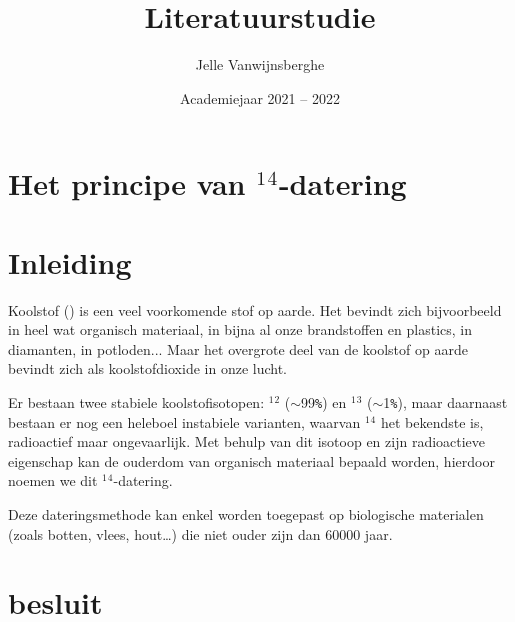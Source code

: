 \documentclass[kulak]{kulakarticle} %
\title{Literatuurstudie}
\author{Jelle Vanwijnsberghe}
\date{Academiejaar 2021 -- 2022}
\begin{document}
\maketitle

\section*{Het principe van $^1$$^4$-datering}

\section*{Inleiding}

Koolstof () is een veel voorkomende stof op aarde. Het bevindt zich bijvoorbeeld in heel wat organisch materiaal, in bijna al onze brandstoffen en plastics, in diamanten, in potloden... Maar het overgrote deel van de koolstof op aarde bevindt zich als koolstofdioxide in onze lucht. 

Er bestaan twee stabiele koolstofisotopen: $^1$$^2$ ($\sim$\num{99}\verb|%|) en $^1$$^3$ ($\sim$\num{1}\verb|%|), maar daarnaast bestaan er nog een heleboel instabiele varianten, waarvan $^1$$^4$ het bekendste is, radioactief maar ongevaarlijk. Met behulp van dit isotoop en zijn radioactieve eigenschap kan de ouderdom van organisch materiaal bepaald worden, hierdoor noemen we dit $^1$$^4$-datering.

Deze dateringsmethode kan enkel worden toegepast op biologische materialen (zoals botten, vlees, hout…) die niet ouder zijn dan \num{60000} jaar. 

\section{besluit}
\end{document}
